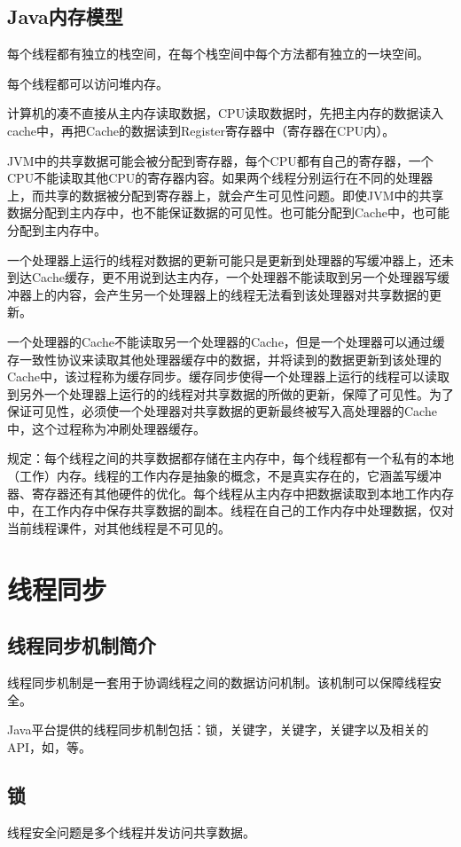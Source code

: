 \documentclass[a4paper]{report}
\begin{document}
\section{Java内存模型}
每个线程都有独立的栈空间，在每个栈空间中每个方法都有独立的一块空间。

每个线程都可以访问堆内存。

计算机的凑不直接从主内存读取数据，CPU读取数据时，先把主内存的数据读入cache中，再把Cache的数据读到Register寄存器中（寄存器在CPU内）。

JVM中的共享数据可能会被分配到寄存器，每个CPU都有自己的寄存器，一个CPU不能读取其他CPU的寄存器内容。如果两个线程分别运行在不同的处理器上，而共享的数据被分配到寄存器上，就会产生可见性问题。即使JVM中的共享数据分配到主内存中，也不能保证数据的可见性。也可能分配到Cache中，也可能分配到主内存中。

一个处理器上运行的线程对数据的更新可能只是更新到处理器的写缓冲器上，还未到达Cache缓存，更不用说到达主内存，一个处理器不能读取到另一个处理器写缓冲器上的内容，会产生另一个处理器上的线程无法看到该处理器对共享数据的更新。

一个处理器的Cache不能读取另一个处理器的Cache，但是一个处理器可以通过缓存一致性协议来读取其他处理器缓存中的数据，并将读到的数据更新到该处理的Cache中，该过程称为缓存同步。缓存同步使得一个处理器上运行的线程可以读取到另外一个处理器上运行的的线程对共享数据的所做的更新，保障了可见性。为了保证可见性，必须使一个处理器对共享数据的更新最终被写入高处理器的Cache中，这个过程称为冲刷处理器缓存。

规定：每个线程之间的共享数据都存储在主内存中，每个线程都有一个私有的本地（工作）内存。线程的工作内存是抽象的概念，不是真实存在的，它涵盖写缓冲器、寄存器还有其他硬件的优化。每个线程从主内存中把数据读取到本地工作内存中，在工作内存中保存共享数据的副本。线程在自己的工作内存中处理数据，仅对当前线程课件，对其他线程是不可见的。
\chapter{线程同步}
\section{线程同步机制简介}
线程同步机制是一套用于协调线程之间的数据访问机制。该机制可以保障线程安全。

Java平台提供的线程同步机制包括：锁，关键字，关键字，关键字以及相关的API，如，等。
\section{锁}
线程安全问题是多个线程并发访问共享数据。
\end{document}
